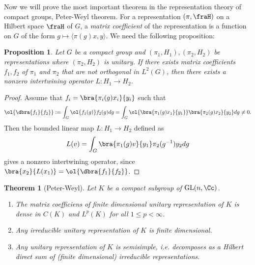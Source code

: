 \documentclass{article}
\newtheorem{theorem}{Theorem}[section]
\newcommand{\GL}{\mathrm{GL}}
\newtheorem{proposition}{Proposition}[section]
\begin{document}
Now we will prove the most important theorem in the representation theory of compact groups, Peter-Weyl theorem. For a representation $(\pi, \fraH)$ on a Hilbert space $\fraH$ of $G$, a \emph{matrix coefficient} of the representation is a function on $G$ of the form $g\mapsto \langle \pi(g)x, y\rangle$. 
We need the following proposition:
\begin{proposition}
\label{nonzeroint}
Let $G$ be a compact group and $(\pi_{1}, H_{1}), (\pi_{2}, H_{2})$ be representations where $(\pi_{2}, H_{2})$ is unitary. 
If there exists matrix coefficients $f_{1}, f_{2}$ of $\pi_{1}$ and $\pi_{2}$ that are not orthogonal in $L^{2}(G)$, then there exists a nonzero intertwining operator $L:H_{1}\to H_{2}$. 
\end{proposition}
\begin{proof}
Assume that $f_{i} = \bra{\pi_{i}(g)x_{i}}{y_{i}}$ such that
$$
\ol{\dbra{f_{1}}{f_{2}}} := \int_{G} \ol{f_{1}(g)} f_{2}(g) dg = \int_{G} \ol{\bra{\pi_{1}(g)x_{1}}{y_{1}}}\bra{\pi_{2}(g)x_{2}}{y_{2}} dg \neq 0. 
$$
Then the bounded linear map $L:H_{1}\to H_{2}$ defined as
$$
L(v) = \int_{G} \bra{\pi_{1}(g)v}{y_{1}} \pi_{2}(g^{-1})y_{2} dg
$$
gives a nonzero intertwining operator, since $\bra{x_{2}}{L(x_{1})} = \ol{\dbra{f_{1}}{f_{2}}}$. 
\end{proof}
\begin{theorem}[Peter-Weyl]
Let $K$ be a compact subgroup of $\GL(n, \Cc)$.
\begin{enumerate}
\item The matrix coefficiens of finite dimensional unitary representation of $K$ is dense in $C(K)$ and $L^{p}(K)$ for all $1\leq p <\infty$. 
\item Any irreducible unitary representation of $K$ is finite dimensional. 
\item Any unitary representation of $K$ is semisimple, i.e. decomposes as a Hilbert direct sum of (finite dimensional) irreducible representations. 
\end{enumerate}
\end{theorem}
\end{document}
